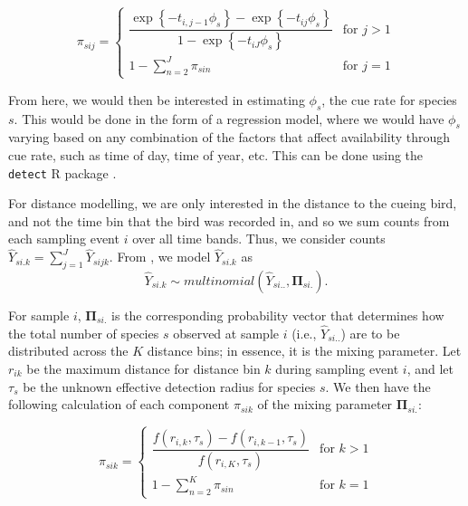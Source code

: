 \begin{equation*}
	\pi_{sij} = 
	\begin{cases}
		\dfrac{\exp\left\{ -t_{i,j-1}\phi_{s} \right\} - \exp\left\{ -t_{ij}\phi_{s} \right\}}{1 - \exp\left\{ -t_{iJ}\phi_{s} \right\}} & \text{for } j > 1 \\
		1 - \sum_{n = 2}^{J} \pi_{sin} & \text{for } j = 1
	\end{cases}
\end{equation*}

\par From here, we would then be interested in estimating $\phi_s$, the cue rate for species $s$.
This would be done in the form of a regression model, where we would have $\phi_s$ varying based on any combination of the factors that affect availability through cue rate, such as time of day, time of year, etc.
This can be done using the \texttt{detect} R package \citep{solymos_detect_2020}.

\par For distance modelling, we are only interested in the distance to the cueing bird, and not the time bin that the bird was recorded in, and so we sum counts from each sampling event $i$ over all time bands. 
Thus, we consider counts $\hat{Y}_{si.k} = \sum_{j=1}^{J}\hat{Y}_{sijk}$. 
From \citet{solymos_calibrating_2013}, we model $\hat{Y}_{si.k}$ as
$$\hat{Y}_{si.k} \sim multinomial\left(\hat{Y}_{si..}, \mathbf{\Pi}_{si.}\right).$$

\par For sample $i$, $\mathbf{\Pi}_{si.}$ is the corresponding probability vector that determines how the total number of species $s$ observed at sample $i$ (i.e., $\hat{Y}_{si..}$) are to be distributed across the $K$ distance bins; in essence, it is the mixing parameter. 
Let $r_{ik}$ be the maximum distance for distance bin $k$ during sampling event $i$, and let $\tau_s$ be the unknown effective detection radius for species $s$. 
We then have the following calculation of each component $\pi_{sik}$ of the mixing parameter $\mathbf{\Pi}_{si.}$:

\begin{equation*}
	\pi_{sik} = 
	\begin{cases}
		\dfrac{f(r_{i,k}, \tau_s) - f(r_{i,k-1}, \tau_s)}{f(r_{i,K}, \tau_s)} & \text{for } k > 1 \\
		1 - \sum_{n = 2}^{K} \pi_{sin} & \text{for } k = 1
	\end{cases}
\end{equation*}

